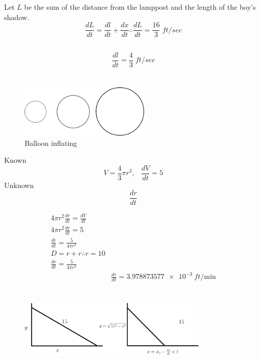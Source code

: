 \documentclass[16pt letter]{article}
\begin{document}
Let $L$ be the sum of the distance from the lamppost and the length of the boy's shadow.
\[\frac{dL}{dt} = \frac{dl}{dt} + \frac{dx}{dt} \therefore \frac{dL}{dt} = \frac{16}{3}\; ft/sec\]

\subsection{}

\[\frac{dl}{dt} = \frac{4}{3}\;ft/sec\]
\pagebreak

\section{}
\label{q:4}

\begin{figure}[h]
	\centering
	\includegraphics[width=0.55\textwidth]{Application Q4}
	\caption{Balloon inflating}
	\label{fig:inflating}
\end{figure}

Known \[V = \frac{4}{3}\pi r^3, \;\;\ \frac{dV}{dt} = 5\]
Unknown \[\frac{dr}{dt}\]

\begin{align*}
	4 \pi r^2 \frac{dr}{dt} = \frac{dV}{dt}            \\
	4 \pi r^2 \frac{dr}{dt} = 5                        \\
	\frac{dr}{dt} = \frac{5}{4 \pi r^2}                \\[20pt]
	D = r + r \therefore r = 10                        \\[20pt]
	\frac{dr}{dt} = \frac{5}{4 \pi r^2}                \\\
	 & \frac{dr}{dt} = \SI{3.978873577e-3}{ft/\minute}
\end{align*}
\pagebreak

\section{}
\label{q:5}
\begin{figure}[h]
	\centering
	\includegraphics[width=0.80\textwidth]{Application Q5}
\end{figure}
\end{document}
